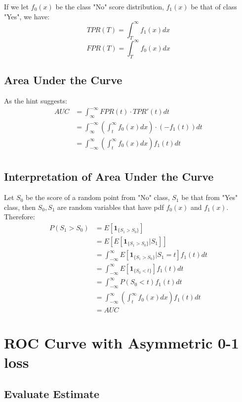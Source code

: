 \documentclass[11pt]{article}
\begin{document}
If we let \(f_0(x)\) be the class "No" score distribution, \(f_1(x)\) be
that of class "Yes", we have: \[
TPR(T) = \int_T^{\infty} f_1(x)dx
\] \[
FPR(T) = \int_T^{\infty} f_0(x)dx
\]

    \subsection{Area Under the Curve}\label{area-under-the-curve}

As the hint suggests: \[
\begin{split}
AUC &= \int_{\infty}^{-\infty} FPR(t) \cdot TPR'(t) dt \\
&= \int_{\infty}^{-\infty} \left( \int_t^{\infty} f_0(x)dx \right) \cdot (-f_1(t)) dt \\
&= \int_{-\infty}^{\infty} \left( \int_t^{\infty} f_0(x)dx \right) f_1(t) dt \\
\end{split}
\]

    \subsection{Interpretation of Area Under the
Curve}\label{interpretation-of-area-under-the-curve}

Let \(S_0\) be the score of a random point from "No" class, \(S_1\) be
that from "Yes" class, then \(S_0, S_1\) are random variables that have
pdf \(f_0(x)\) and \(f_1(x)\). Therefore: \[
\begin{split}
P(S_1>S_0) &= E[\mathbf{1}_{\{S_1 > S_0\}}] \\
&= E[E[\mathbf{1}_{\{S_1 > S_0\}} | S_1]] \\
&= \int_{-\infty}^{\infty}E[\mathbf{1}_{\{S_1 > S_0\}} | S_1=t]f_1(t)dt \\
&= \int_{-\infty}^{\infty}E[\mathbf{1}_{\{S_0 < t\}}]f_1(t)dt \\
&= \int_{-\infty}^{\infty}P(S_0 < t)f_1(t)dt \\
&=\int_{-\infty}^{\infty} \left( \int_t^{\infty} f_0(x)dx \right) f_1(t) dt \\
&=AUC
\end{split}
\]

    \section{ROC Curve with Asymmetric 0-1
loss}\label{roc-curve-with-asymmetric-0-1-loss}

    \subsection{Evaluate Estimate}\label{evaluate-estimate}
\end{document}
